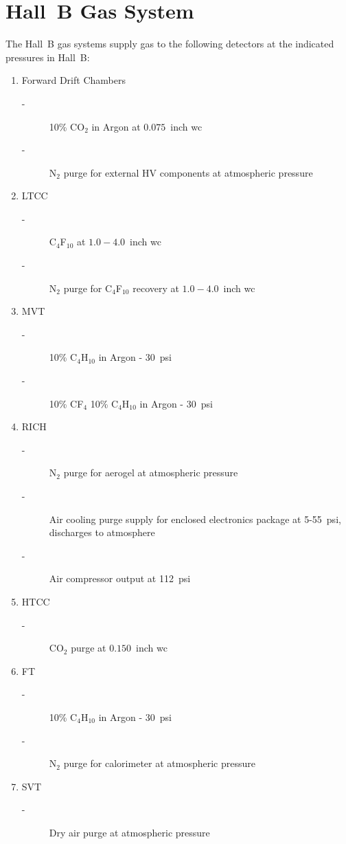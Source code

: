 \section{Hall~B Gas System}

The Hall~B gas systems supply gas to the following detectors at the indicated pressures 
in Hall~B:
\begin{enumerate}
\item Forward Drift Chambers 
\begin{description}
\item[-] 10\% CO$_2$ in Argon at $0.075$~inch wc
\item[-] N$_2$ purge for external HV components at atmospheric pressure
\end{description}
\item LTCC 
\begin{description}
\item[-] C$_4$F$_{10}$ at $1.0 - 4.0$~inch wc
\item[-] N$_2$ purge for C$_4$F$_{10}$ recovery at $1.0-4.0$~inch wc
\end{description}
\item MVT 
\begin{description}
\item[-] 10\% C$_4$H$_{10}$ in Argon - 30~psi
\item[-] 10\% CF$_4$ 10\% C$_4$H$_{10}$ in Argon - 30~psi 
\end{description}
\item RICH 
\begin{description}
\item[-] N$_2$ purge for aerogel at atmospheric pressure
\item[-] Air cooling purge supply for enclosed electronics package at 5-55~psi, discharges to atmosphere
\item[-] Air compressor output at 112~psi 
\end{description}
\item HTCC 
\begin{description}
\item[-] CO$_2$ purge at $0.150$~inch wc 
\end{description}
\item FT 
\begin{description}
\item[-] 10\% C$_4$H$_{10}$ in Argon - 30~psi
\item[-] N$_2$ purge for calorimeter at atmospheric pressure 
\end{description}
\item SVT
\begin{description}
\item[-] Dry air purge at atmospheric pressure 
\end{description}
\end{enumerate}

